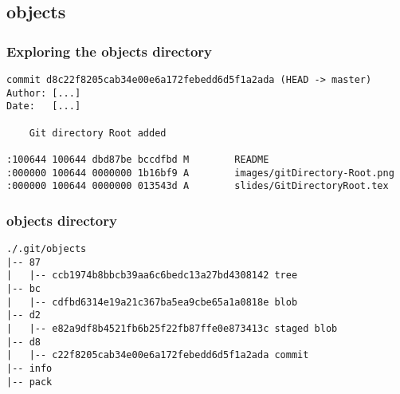 \subsection{objects}
\begin{frame}[fragile]
    \frametitle{Exploring the objects directory}
    \lstset{
        language=bash,
        showstringspaces=true,
        frame=single,
        style=BashInputStyle
    }
    \begin{lstlisting}[caption={git log --raw -n1}, label={fig:lograw}]
commit d8c22f8205cab34e00e6a172febedd6d5f1a2ada (HEAD -> master)
Author: [...]
Date:   [...]

    Git directory Root added

:100644 100644 dbd87be bccdfbd M        README
:000000 100644 0000000 1b16bf9 A        images/gitDirectory-Root.png
:000000 100644 0000000 013543d A        slides/GitDirectoryRoot.tex
    \end{lstlisting}
\end{frame}

\begin{frame}[fragile]
    \frametitle{objects directory}
    \lstset{
        language=bash,
        showstringspaces=true,
        frame=single,
        style=BashInputStyle
    }
    \begin{lstlisting}[caption={[Tree]tree .git/objects example (shortened with comments)},label={fig:objectsdirectory}]
./.git/objects
|-- 87
|   |-- ccb1974b8bbcb39aa6c6bedc13a27bd4308142 tree
|-- bc
|   |-- cdfbd6314e19a21c367ba5ea9cbe65a1a0818e blob
|-- d2
|   |-- e82a9df8b4521fb6b25f22fb87ffe0e873413c staged blob
|-- d8
|   |-- c22f8205cab34e00e6a172febedd6d5f1a2ada commit
|-- info
|-- pack
    \end{lstlisting}
\end{frame}

